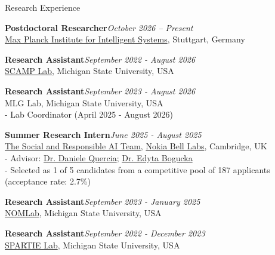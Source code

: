 \documentclass{resume} %
\begin{document}







\begin{rSection}{Research Experience}

{\bf Postdoctoral Researcher}\hfill {\em October 2026 -- Present} 
\\ \href{https://is.mpg.de/en}{Max Planck Institute for Intelligent Systems}, Stuttgart, Germany  

{\bf Research Assistant}\hfill {\em September 2022 - August 2026} 
\\ \href{https://www.scamp-lab.com/}{SCAMP Lab}, Michigan State University, USA  


{\bf Research Assistant}\hfill {\em September 2023 - August 2026} 
\\ MLG Lab, Michigan State University, USA
\\ - Lab Coordinator (April 2025 - August 2026)



{\bf Summer Research Intern}\hfill {\em June 2025 - August 2025} 
\\ \href{https://social-dynamics.net/projects.html}{The Social and Responsible AI Team}, \href{https://www.bell-labs.com/about/locations/cambridge-uk/#gref}{Nokia Bell Labs}, Cambridge, UK
\\ - Advisor: \href{https://researchswinger.org/}{Dr. Daniele Quercia}; \href{https://www.nokia.com/people/edyta-bogucka/}{Dr. Edyta Bogucka}
\\  - Selected as 1 of 5 candidates from a competitive pool of 187 applicants (acceptance rate: 2.7\%)

{\bf Research Assistant}\hfill {\em September 2023 - January 2025}
\\ \href{https://nomcomm.github.io/}{NOMLab}, Michigan State University, USA  

{\bf Research Assistant}\hfill {\em September 2022 - December 2023} 
\\ \href{https://www.spartie.org/}{SPARTIE Lab}, Michigan State University, USA 


\end{rSection}
\end{document}

